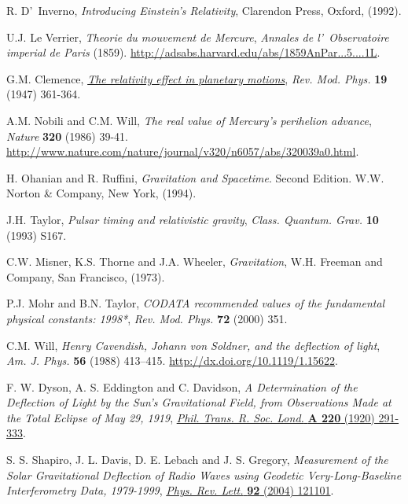 \begin{thebibliography}{99}
 R. D'~Inverno, {\em Introducing Einstein's Relativity}, Clarendon Press, Oxford, (1992).




 U.J. Le Verrier, {\em Theorie du mouvement de Mercure}, {\sl Annales de l'\ Observatoire imperial de Paris}  (1859). \url{http://adsabs.harvard.edu/abs/1859AnPar...5....1L}.

 G.M. Clemence, \href{http://rmp.aps.org/abstract/RMP/v19/i4/p361_1}{\it The relativity effect in planetary motions}, {\sl Rev. Mod. Phys.} {\bf 19} (1947) 361-364.

 A.M. Nobili and C.M. Will, {\it The real value of Mercury's perihelion advance}, {\sl Nature} {\bf 320} (1986) 39-41. \url{http://www.nature.com/nature/journal/v320/n6057/abs/320039a0.html}.

 H. Ohanian and R. Ruffini, {\em Gravitation and Spacetime}. Second Edition. W.W. Norton \& Company, New York, (1994).

 J.H. Taylor, {\em Pulsar timing and relativistic gravity}, {\sl Class. Quantum. Grav.} {\bf 10}  (1993) S167.



 C.W. Misner, K.S. Thorne and J.A. Wheeler, {\em Gravitation},
W.H. Freeman and Company, San Francisco, (1973).

P.J. Mohr and B.N. Taylor, {\it CODATA recommended values of
the fundamental physical constants: 1998*}, {\sl Rev. Mod. Phys.} {\bf 72}
(2000) 351.

 C.M. Will, {\em Henry Cavendish, Johann von Soldner, and the deflection of light},  {\sl Am. J. Phys.} {\bf  56} (1988) 413--415. \url{http://dx.doi.org/10.1119/1.15622}.

F. W. Dyson, A. S. Eddington and C. Davidson, {\em A Determination of the Deflection of Light by the Sun's Gravitational Field, from Observations Made at the Total Eclipse of May 29, 1919}, \href{http://www.jstor.org/stable/91137}{{\sl Phil. Trans. R. Soc. Lond.} {\bf A 220} (1920) 291-333}.

 S. S. Shapiro, J. L. Davis, D. E. Lebach and J. S. Gregory, {\em Measurement of the Solar Gravitational Deflection of Radio Waves using Geodetic Very-Long-Baseline Interferometry Data, 1979-1999}, \href{http://link.aps.org/doi/10.1103/PhysRevLett.92.121101
}{{\sl Phys. Rev. Lett.} {\bf 92} (2004) 121101}.


\end{thebibliography}
